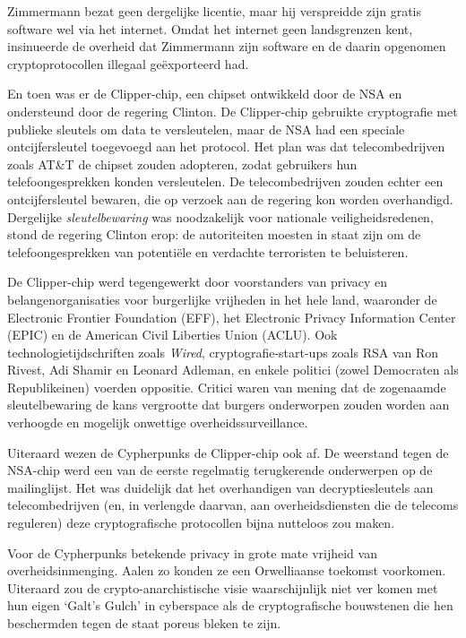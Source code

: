 \documentclass[
  a5paper,
  smalldemyvopaper,11pt,twoside,onecolumn,openright,extrafontsizes]{memoir}
\begin{document}
Zimmermann bezat geen dergelijke licentie, maar hij verspreidde zijn
gratis software wel via het internet. Omdat het internet geen
landsgrenzen kent, insinueerde de overheid dat Zimmermann zijn software
en de daarin opgenomen cryptoprotocollen illegaal geëxporteerd had.

En toen was er de Clipper-chip, een chipset ontwikkeld door de NSA en
ondersteund door de regering Clinton. De Clipper-chip gebruikte
cryptografie met publieke sleutels om data te versleutelen, maar de NSA
had een speciale ontcijfersleutel toegevoegd aan het protocol. Het plan
was dat telecombedrijven zoals AT\&T de chipset zouden adopteren, zodat
gebruikers hun telefoongesprekken konden versleutelen. De
telecombedrijven zouden echter een ontcijfersleutel bewaren, die op
verzoek aan de regering kon worden overhandigd. Dergelijke
\emph{sleutelbewaring} was noodzakelijk voor nationale
veiligheidsredenen, stond de regering Clinton erop: de autoriteiten
moesten in staat zijn om de telefoongesprekken van potentiële en
verdachte terroristen te beluisteren.

De Clipper-chip werd tegengewerkt door voorstanders van privacy en
belangenorganisaties voor burgerlijke vrijheden in het hele land,
waaronder de Electronic Frontier Foundation (EFF), het Electronic
Privacy Information Center (EPIC) en de American Civil Liberties Union
(ACLU). Ook technologietijdschriften zoals \emph{Wired},
cryptografie-start-ups zoals RSA van Ron Rivest, Adi Shamir en Leonard
Adleman, en enkele politici (zowel Democraten als Republikeinen) voerden
oppositie. Critici waren van mening dat de zogenaamde sleutelbewaring de
kans vergrootte dat burgers onderworpen zouden worden aan verhoogde en
mogelijk onwettige overheidssurveillance.

Uiteraard wezen de Cypherpunks de Clipper-chip ook af. De weerstand
tegen de NSA-chip werd een van de eerste regelmatig terugkerende
onderwerpen op de mailinglijst. Het was duidelijk dat het overhandigen
van decryptiesleutels aan telecombedrijven (en, in verlengde daarvan,
aan overheidsdiensten die de telecoms reguleren) deze cryptografische
protocollen bijna nutteloos zou maken.

Voor de Cypherpunks betekende privacy in grote mate vrijheid van
overheidsinmenging. Aalen zo konden ze een Orwelliaanse toekomst
voorkomen. Uiteraard zou de crypto-anarchistische visie waarschijnlijk
niet ver komen met hun eigen `Galt's Gulch' in cyberspace als de
cryptografische bouwstenen die hen beschermden tegen de staat poreus
bleken te zijn.
\end{document}
